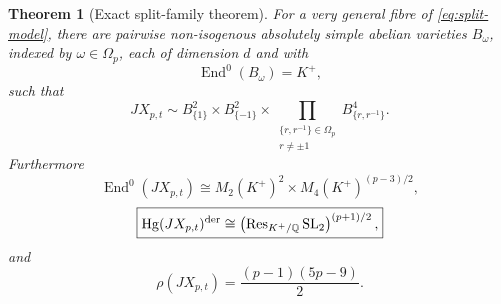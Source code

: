 \documentclass[11pt]{article}
\newtheorem{theorem}{Theorem}[section]
\theoremstyle{definition}
\theoremstyle{remark}
\newcommand{\Q}{\mathbb Q}
\newcommand{\Hg}{\operatorname{Hg}}
\newcommand{\End}{\operatorname{End}}
\newcommand{\Res}{\operatorname{Res}}
\begin{document}
\begin{theorem}[Exact split-family theorem]\label{thm:split-exact}
For a very general fibre of \eqref{eq:split-model}, there are pairwise non-isogenous absolutely simple abelian varieties $B_\omega$, indexed by $\omega\in\Omega_p$, each of dimension $d$ and with
\[
 \End^0(B_\omega)=K^+,
\]
such that
\begin{equation}\label{eq:split-isogeny}
 JX_{p,t}\sim
 B_{\{1\}}^2\times B_{\{-1\}}^2\times
 \prod_{\substack{\{r,r^{-1}\}\in\Omega_p\\r\ne\pm1}}B_{\{r,r^{-1}\}}^4.
\end{equation}
Furthermore
\begin{equation}\label{eq:split-end}
 \boxed{
 \End^0(JX_{p,t})\cong
 M_2(K^+)^2\times M_4(K^+)^{(p-3)/2},}
\end{equation}
\begin{equation}\label{eq:split-Hg}
 \boxed{
 \Hg(JX_{p,t})^{\rm der}\cong
 \left(\Res_{K^+/\Q}\mathrm{SL}_2\right)^{(p+1)/2},}
\end{equation}
and
\begin{equation}\label{eq:split-NS}
 \boxed{
 \rho(JX_{p,t})=
 \frac{(p-1)(5p-9)}2.}
\end{equation}
\end{theorem}
\end{document}
